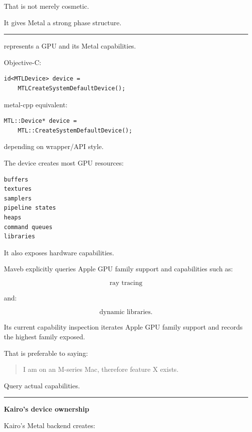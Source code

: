 That is not merely cosmetic.

It gives Metal a strong phase structure.

\begin{center}\rule{0.5\linewidth}{0.5pt}\end{center}

\textbf{}

 represents a GPU and its Metal capabilities.

Objective-C:

\begin{verbatim}
id<MTLDevice> device =
    MTLCreateSystemDefaultDevice();
\end{verbatim}

metal-cpp equivalent:

\begin{verbatim}
MTL::Device* device =
    MTL::CreateSystemDefaultDevice();
\end{verbatim}

depending on wrapper/API style.

The device creates most GPU resources:

\begin{verbatim}
buffers
textures
samplers
pipeline states
heaps
command queues
libraries
\end{verbatim}

It also exposes hardware capabilities.

Maveb explicitly queries Apple GPU family support and capabilities such as:

\[
\text{ray tracing}
\]

and:

\[
\text{dynamic libraries}.
\]

Its current capability inspection iterates Apple GPU family support and records the highest family exposed.

That is preferable to saying:

\begin{quote}
I am on an M-series Mac, therefore feature X exists.
\end{quote}

Query actual capabilities.

\begin{center}\rule{0.5\linewidth}{0.5pt}\end{center}

\textbf{Kairo's device ownership}

Kairo's Metal backend creates:

